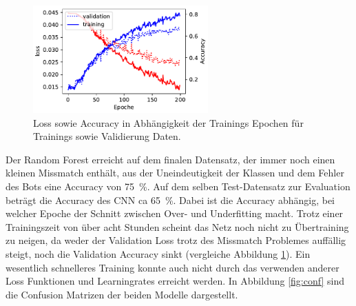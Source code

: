 \begin{figure}
		\vspace{-0.6cm}
		\centering
		\includegraphics[width=0.6\textwidth]{pictures/train_nn.pdf}
		\vspace{-1.2cm}
		\caption{Loss sowie Accuracy in Abhängigkeit der Trainings Epochen für
		Trainings sowie Validierung Daten.}
		\vspace{-0.2cm}
		\centering
		\label{fig:t_nn}
\end{figure}
Der Random Forest erreicht auf dem finalen Datensatz, der immer noch einen
kleinen Missmatch enthält, aus der Uneindeutigkeit der Klassen und dem Fehler
des Bots eine Accuracy von \SI{75}{\percent}. 
Auf dem selben Test-Datensatz zur Evaluation beträgt die Accuracy des CNN ca
\SI{65}{\percent}.
Dabei ist die Accuracy abhängig, bei welcher Epoche der Schnitt zwischen Over-
und Underfitting macht.
Trotz einer Trainingszeit von über acht Stunden scheint das Netz noch nicht zu
Übertraining zu neigen, da weder der Validation Loss trotz des 
Missmatch Problemes auffällig steigt, noch die Validation Accuracy 
sinkt (vergleiche Abbildung \ref{fig:t_nn}).
Ein wesentlich schnelleres Training konnte auch nicht durch das verwenden 
anderer Loss Funktionen und Learningrates erreicht werden.
In Abbildung \ref{fig:conf} sind die Confusion Matrizen der beiden Modelle
dargestellt. 
